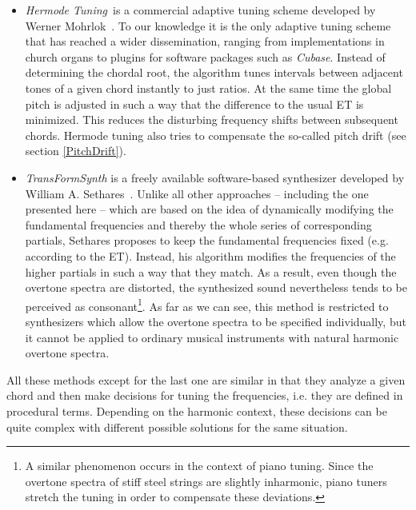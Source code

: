 \begin{itemize}
\item \textit{Hermode Tuning}\texttrademark ~is a commercial adaptive tuning scheme developed by Werner Mohrlok~\cite{Hermode}. To our knowledge it is the only adaptive tuning scheme that has reached a wider dissemination, ranging from implementations in church organs to plugins for software packages such as \textit{Cubase}\texttrademark. Instead of determining the chordal root, the algorithm tunes intervals between adjacent tones of a given chord instantly to just ratios. At the same time the global pitch is adjusted in such a way that the difference to the usual ET is minimized. This reduces the disturbing frequency shifts between subsequent chords. Hermode tuning also tries to compensate the so-called pitch drift (see section \ref{PitchDrift}).

\item\textit{TransFormSynth} is a freely available software-based synthesizer developed by William A. Sethares~\cite{Sethares}. Unlike all other approaches -- including the one presented here -- which are based on the idea of dynamically modifying the fundamental frequencies and thereby the whole series of corresponding partials, Sethares  proposes to keep the fundamental frequencies fixed (e.g. according to the ET). Instead, his algorithm modifies the frequencies of the higher partials in such a way that they match. As a result, even though the overtone spectra are distorted, the synthesized sound nevertheless tends to be perceived as consonant\footnote{A similar phenomenon occurs in the context of piano tuning. Since the overtone spectra of stiff steel strings are slightly inharmonic, piano tuners stretch the tuning in order to compensate these deviations.}. As far as we can see, this method is restricted to synthesizers which allow the overtone spectra to be specified individually, but it cannot be applied to ordinary musical instruments with natural harmonic overtone spectra.
\end{itemize}

\noindent
All these methods except for the last one are similar in that they analyze a given chord and then make decisions for tuning the frequencies, i.e. they are defined in procedural terms. Depending on the harmonic context, these decisions can be quite complex with different possible solutions for the same situation.

